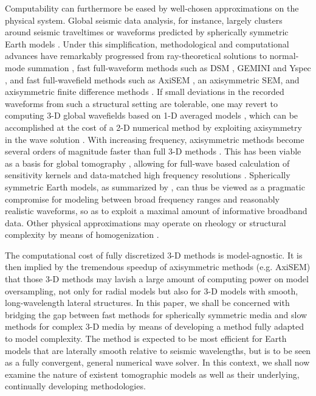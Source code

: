\documentclass[extra,referee]{gji}
\begin{document}
Computability can furthermore be eased by well-chosen approximations 
on the physical system. 
Global seismic data analysis, for instance, largely clusters around seismic traveltimes 
or waveforms predicted by spherically symmetric Earth models \cite[]{rawlinson2010seismic,
driel2015instaseis}.
Under this simplification, methodological and computational advances have remarkably progressed 
from ray-theoretical solutions \cite[]{jeffreys1958seismological} 
to normal-mode summation \cite[e.g., Chap 8,][]{dahlen1998theoretical},
fast full-waveform methods such as
DSM \cite[]{kawai2006complete}, GEMINI \cite[]{friederich1995complete} and 
Yspec \cite[]{al2008calculation}, 
and fast full-wavefield methods such as AxiSEM \cite[]{nissen2014axisem}, an axisymmetric SEM, and 
axisymmetric finite difference methods \cite[]{igel1995sh, toyokuni2006fdm}. 
If small deviations in the recorded waveforms from such a structural setting
are tolerable, one may revert to computing 3-D global wavefields based on
1-D averaged models \cite[e.g. PREM,][]{dziewonski1981prem}, 
which can be accomplished at the cost of a 2-D
numerical method by exploiting axisymmetry in the wave solution
\cite[]{nissen2007axisem}. 
With increasing frequency, axisymmetric methods become 
several orders of magnitude faster than full 3-D methods \cite[]{nissen2014axisem}. 
This has been viable as a basis for global tomography 
\cite[]{rawlinson2010seismic}, allowing for full-wave based calculation 
of sensitivity kernels \cite[]{colombi2012kernels} and data-matched 
high frequency resolutions \cite[e.g. 1Hz,][]{hosseini2015multifrequency}. 
Spherically symmetric Earth models, as summarized by \cite{nissen2014axisem},
can thus be viewed as a pragmatic compromise for modeling between broad
frequency ranges and reasonably realistic waveforms, so as to exploit 
a maximal amount of informative broadband data.
Other physical approximations may operate on rheology 
\cite[e.g., acoustic approximation, ][]{zhu2009elastic}
or structural complexity by means of homogenization \cite[]{capdeville2013residual}.

The computational cost of fully discretized 3-D methods is model-agnostic. 
It is then implied by the tremendous speedup of axisymmetric methods 
(e.g. AxiSEM) that those 3-D methods may lavish a large 
amount of computing power on model oversampling, not only for radial models but 
also for 3-D models with smooth, long-wavelength lateral structures.  
In this paper, we shall be concerned with bridging the gap between 
fast methods for spherically symmetric media and slow methods for
complex 3-D media by means of developing a method fully 
adapted to model complexity. 
The method is expected to be most efficient for 
Earth models that are laterally smooth relative to seismic wavelengths, 
but is to be seen as a fully convergent, general numerical wave solver. 
In this context, we shall
now examine the nature of existent tomographic models as well as their
underlying, continually developing methodologies.
\end{document}
